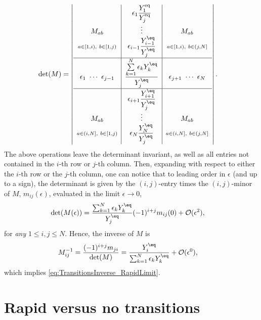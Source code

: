 \documentclass[preprint,5p,twocolumn]{elsarticle}
\begin{document}
%
%
\begin{align}
&\text{det}(M) =\left| 
\begin{array}{c|c|c} 
%
&\epsilon_1 \dfrac{Y_1^\text{eq}}{Y_j^\text{eq}} 
&
\\
M_{ab}
&\vdots
&M_{ab}
\\
 \mathsmaller{a \in [1,i),~b \in [1,j)}
&\epsilon_{i-1} \dfrac{Y_{i-1}^\eq}{Y_j^\eq} 
&\mathsmaller{a \in [1,i),~b \in (j,N]}
\\[1em] \hline 
\epsilon_1 ~\cdots~ \epsilon_{j-1} 
&\dfrac{\sum\limits_{k=1}^N\epsilon_k Y_k^{\eq}}{Y_j^{\eq}} 
&\epsilon_{j+1} ~\cdots~ \epsilon_{N}
\\[1em] \hline 
%
&\epsilon_{i+1} \dfrac{Y_{i+1}^\eq}{Y_j^\eq} 
&
\\
M_{ab}
&\vdots 
&M_{ab}
\\
 \mathsmaller{a \in (i,N],~b \in [1,j)}
&\epsilon_{N} \dfrac{Y_{N}^\eq}{Y_j^\eq}
& \mathsmaller{a \in (i,N],~b \in (j,N]}
\end{array} 
\right| .
\end{align}
%
The above operations leave the determinant invariant, as well as all entries not contained in the $i$-th row or $j$-th column.
Then, expanding with respect to either the $i$-th row or the $j$-th column, one can notice that to leading order in $\epsilon$ (and up to a sign), the determinant is given by the $(i,j)$-entry times the $(i,j)$-minor of $M$, $m_{ij}(\epsilon)$, evaluated in the limit $\epsilon \to 0$, 
%
\begin{align}
\text{det}(M(\epsilon))&=
\dfrac{\sum_{k=1}^N\epsilon_k Y_k^{\eq}}{Y_j^{\eq}} 
(-1)^{i+j} m_{ij}(0)
+ \mathcal{O}(\epsilon^2) ,
\label{eq:detM_expansion}
\end{align}
%
for \emph{any} $1 \leqslant i,j \leqslant N$. Hence, the inverse of $M$ is
\begin{align}
M^{-1}_{ij} &= \dfrac{(-1)^{i+j} m_{ji}}{\text{det}(M)} 
= \dfrac{Y_i^{\eq}}{\sum_{k=1}^N\epsilon_k Y_k^{\eq}} 
+ {\cal O}(\epsilon^0),
\label{eq:Minverse_result}
\end{align}
which implies \cref{eq:TransitionsInverse_RapidLimit}.






\section{Rapid versus no transitions \label{App:Inequality}}
\end{document}
